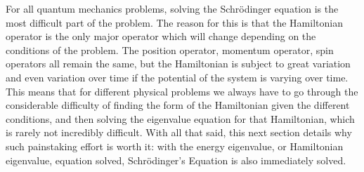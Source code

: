 For all quantum mechanics problems, solving the Schr\"{o}dinger equation is the most difficult part of the problem. The reason for this is that the Hamiltonian operator is the only major operator which will change depending on the conditions of the problem. The position operator, momentum operator, spin operators all remain the same, but the Hamiltonian is subject to great variation and even variation over time if the potential of the system is varying over time. This means that for different physical problems we always have to go through the considerable difficulty of finding the form of the Hamiltonian given the different conditions, and then solving the eigenvalue equation for that Hamiltonian, which is rarely not incredibly difficult. With all that said, this next section details why such painstaking effort is worth it: with the energy eigenvalue, or Hamiltonian eigenvalue, equation solved, Schr\"{o}dinger's Equation is also immediately solved.
